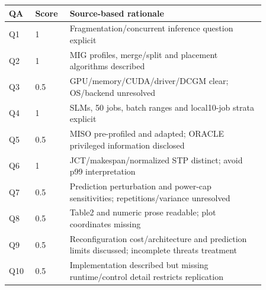 \begin{longtable}{P{0.09\linewidth}P{0.10\linewidth}P{0.67\linewidth}}
\toprule QA & Score & Source-based rationale\\\midrule\endhead
Q1 & 1 & Fragmentation/concurrent inference question explicit\\
Q2 & 1 & MIG profiles, merge/split and placement algorithms described\\
Q3 & 0.5 & GPU/memory/CUDA/driver/DCGM clear; OS/backend unresolved\\
Q4 & 1 & SLMs, 50 jobs, batch ranges and local10-job strata explicit\\
Q5 & 0.5 & MISO pre-profiled and adapted; ORACLE privileged information disclosed\\
Q6 & 1 & JCT/makespan/normalized STP distinct; avoid p99 interpretation\\
Q7 & 0.5 & Prediction perturbation and power-cap sensitivities; repetitions/variance unresolved\\
Q8 & 0.5 & Table2 and numeric prose readable; plot coordinates missing\\
Q9 & 0.5 & Reconfiguration cost/architecture and prediction limits discussed; incomplete threats treatment\\
Q10 & 0.5 & Implementation described but missing runtime/control detail restricts replication\\
\bottomrule\end{longtable}

